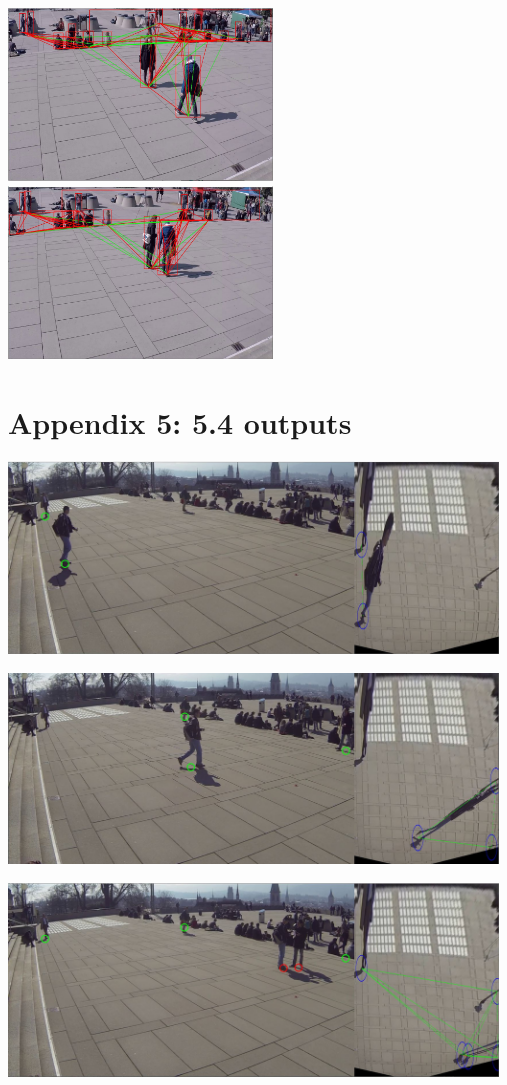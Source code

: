 \documentclass[12pt]{report}
\begin{document}
\includegraphics[width=70mm]{./images/appendix/Cam7Clip1BoundingBoxTest3.JPG}
\includegraphics[width=70mm]{./images/appendix/Cam7Clip1BoundingBoxTest5.JPG}

\section*{Appendix 5: 5.4 outputs}
\includegraphics[width=130mm]{./images/appendix/MatrixTransExample1.JPG}

\includegraphics[width=130mm]{./images/appendix/MatrixTransExample2.JPG}

\includegraphics[width=130mm]{./images/appendix/MatrixTransExample4.JPG}
\end{document}

